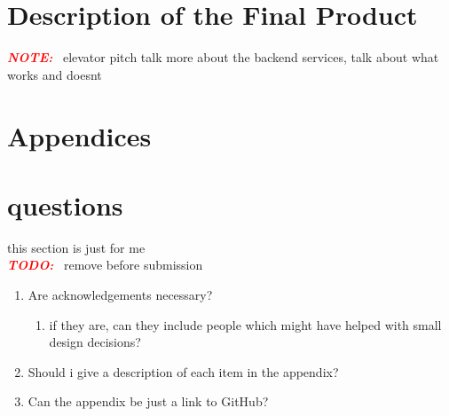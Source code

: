 \documentclass{article}
\newcommand{\vspaceconst}{-2ex}
\newcommand{\TODO}{\textbf{\textit{\textcolor{red}{TODO:}}} }
\newcommand{\NOTE}{\textbf{\textit{\textcolor{red}{NOTE:}}} }
\begin{document}
\begin{multicols}{2}

\section{Description of the Final Product}
\vspace{\vspaceconst}

\NOTE~elevator pitch talk more about the backend services, talk about what works and doesnt



\newpage
\section*{Appendices}
\vspace{\vspaceconst}

\begin{enumerate}

\end{enumerate}


\section{questions} 
this section is just for me\\
\TODO~remove before submission\\
\begin{enumerate}
  \item Are acknowledgements necessary?
  \begin{enumerate}
    \item if they are, can they include people which might have helped with small design decisions?
  \end{enumerate}
  \item Should i give a description of each item in the appendix?
  \item Can the appendix be just a link to GitHub?
\end{enumerate}


\end{multicols}
\end{document}
